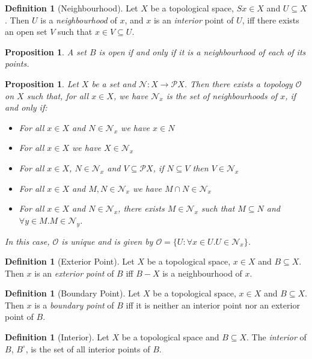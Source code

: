 \documentclass{book}
\newtheorem{prop}[ax]{Proposition}
\theoremstyle{definition}
\newtheorem{df}[ax]{Definition}
\begin{document}
\begin{df}[Neighbourhood]
Let $X$ be a topological space, $Sx \in X$ and $U \subseteq X$. Then $U$ is a \emph{neighbourhood} of $x$, and $x$ is an \emph{interior} point of $U$, iff there exists an open set $V$ such that $x \in V \subseteq U$.
\end{df}

\begin{prop}
A set $B$ is open if and only if it is a neighbourhood of each of its points.
\end{prop}

\begin{prop}
Let $X$ be a set and $\mathcal{N} : X \rightarrow \mathcal{P} X$. Then there exists a topology $\mathcal{O}$ on $X$ such that, for all $x \in X$, we have $\mathcal{N}_x$ is the set of neighbourhoods of $x$, if and only if:
\begin{itemize}
\item For all $x \in X$ and $N \in \mathcal{N}_x$ we have $x \in N$
\item For all $x \in X$ we have $X \in \mathcal{N}_x$
\item For all $x \in X$, $N \in \mathcal{N}_x$ and $V \subseteq \mathcal{P} X$, if $N \subseteq V$ then $V \in \mathcal{N}_x$
\item For all $x \in X$ and $M, N \in \mathcal{N}_x$ we have $M \cap N \in \mathcal{N}_x$
\item For all $x \in X$ and $N \in \mathcal{N}_x$, there exists $M \in \mathcal{N}_x$ such that $M \subseteq N$ and $\forall y \in M. M \in \mathcal{N}_y$.
\end{itemize}
In this case, $\mathcal{O}$ is unique and is given by $\mathcal{O} = \{ U : \forall x \in U. U \in \mathcal{N}_x \}$.
\end{prop}

\begin{df}[Exterior Point]
Let $X$ be a topological space, $x \in X$ and $B \subseteq X$. Then $x$ is an \emph{exterior point} of $B$ iff $B - X$ is a neighbourhood of $x$.
\end{df}

\begin{df}[Boundary Point]
Let $X$ be a topological space, $x \in X$ and $B \subseteq X$. Then $x$ is a \emph{boundary point} of $B$ iff it is neither an interior point nor an exterior point of $B$.
\end{df}

\begin{df}[Interior]
Let $X$ be a topological space and $B \subseteq X$. The \emph{interior} of $B$, $B^\circ$, is the set of all interior points of $B$.
\end{df}
\end{document}
